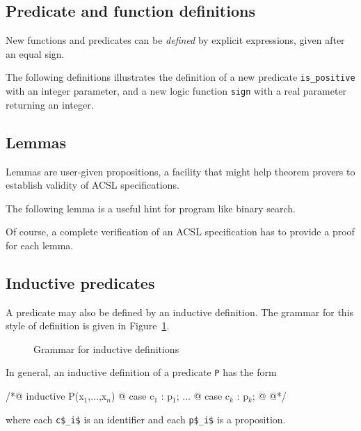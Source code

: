 \subsection{Predicate and function definitions}
New functions and predicates can be \emph{defined} by explicit
expressions, given after an equal sign.
\begin{example}
  The following definitions  illustrates the
  definition of a new predicate \lstinline{is_positive} with an integer
  parameter, and a new logic function \lstinline{sign} with a real
  parameter returning an integer.
\end{example}

\subsection{Lemmas}
Lemmas are user-given propositions, a facility that might help theorem
provers to establish validity of ACSL specifications.

\begin{example}
  The following lemma
  is a useful hint for program like binary search.
\end{example}

Of course, a complete verification of an ACSL specification has to
provide a proof for each lemma.

\subsection{Inductive predicates}
\label{sec:inductivepredicates}

A predicate may also be defined by an inductive definition. The
grammar for this style of definition is given in
Figure~\ref{fig:gram:inductive}.
\begin{figure}[t]
  \begin{cadre} 
    \end{cadre}
  \caption{Grammar for inductive definitions}
\label{fig:gram:inductive}
\end{figure}

In general, an inductive definition of a predicate \lstinline|P| has the form
\begin{listing}{1}
/*@ inductive P(x$_1$,$\ldots$,x$_n$) {
  @   case c$_1$ : p$_1$;
...
  @   case c$_k$ : p$_k$;
  @ }
  @*/
\end{listing}
where each \lstinline|c$_i$| is an identifier and each \lstinline|p$_i$| 
is a proposition.


